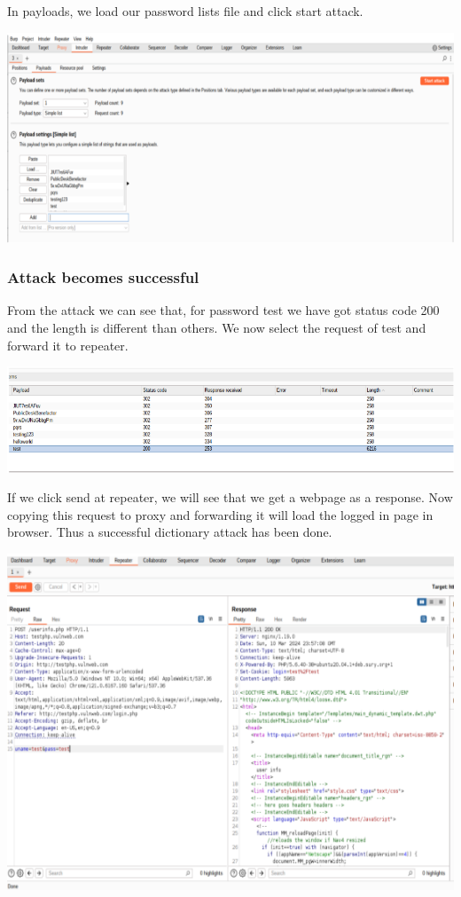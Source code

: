 \documentclass[12pt]{article}
\begin{document}
In payloads, we load our password lists file and click start attack.

\begin{center}
    \includegraphics[max width=\textwidth]{Image13.png}
\end{center}

\subsubsection{Attack becomes successful}\label{subsubsec:attack-becomes-successful}
From the attack we can see that, for password test we have got status code 200 and the length is different than others. We now select the request of test and forward it to repeater.

\begin{center}
    \includegraphics[max width=\textwidth]{Image14.png}
\end{center}

If we click send at repeater, we will see that we get a webpage as a response. Now copying this request to proxy and forwarding it will load the logged in page in browser. Thus a successful dictionary attack has been done.

\begin{center}
    \includegraphics[max width=\textwidth]{Image15.png}
\end{center}
\end{document}
